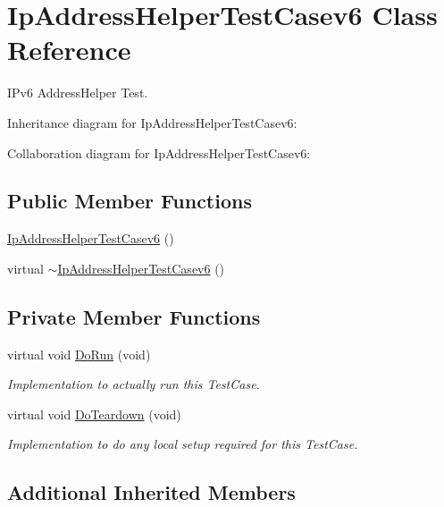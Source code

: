 \hypertarget{classIpAddressHelperTestCasev6}{}\section{Ip\+Address\+Helper\+Test\+Casev6 Class Reference}
\label{classIpAddressHelperTestCasev6}


I\+Pv6 Address\+Helper Test.  




Inheritance diagram for Ip\+Address\+Helper\+Test\+Casev6\+:


Collaboration diagram for Ip\+Address\+Helper\+Test\+Casev6\+:
\subsection*{Public Member Functions}
\begin{DoxyCompactItemize}
\item 
\hyperlink{classIpAddressHelperTestCasev6_a9955452eb1f0be5ac21ef658deca058f}{Ip\+Address\+Helper\+Test\+Casev6} ()
\item 
virtual \hyperlink{classIpAddressHelperTestCasev6_a054e7e53b8638ae69daa31bbf7028689}{$\sim$\+Ip\+Address\+Helper\+Test\+Casev6} ()
\end{DoxyCompactItemize}
\subsection*{Private Member Functions}
\begin{DoxyCompactItemize}
\item 
virtual void \hyperlink{classIpAddressHelperTestCasev6_a784cec04a31e92a998b06becb3538e2d}{Do\+Run} (void)
\begin{DoxyCompactList}\small\item\em Implementation to actually run this Test\+Case. \end{DoxyCompactList}\item 
virtual void \hyperlink{classIpAddressHelperTestCasev6_a560c9635d2119509c0df27f7f5dbbeda}{Do\+Teardown} (void)
\begin{DoxyCompactList}\small\item\em Implementation to do any local setup required for this Test\+Case. \end{DoxyCompactList}\end{DoxyCompactItemize}
\subsection*{Additional Inherited Members}


